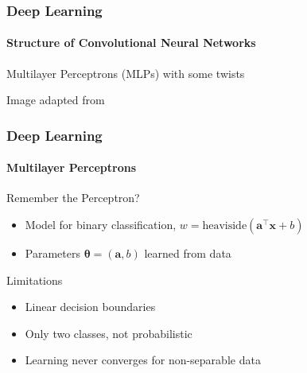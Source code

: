 \documentclass[xetex,professionalfont]{beamer}
\renewcommand{\vec}[1]{\ensuremath{\mathbf{#1}}}
\newcommand{\va}{\vec{a}}
\newcommand{\vx}{\vec{x}}
\newcommand{\bth}{\boldsymbol{\theta}}
\renewcommand\emph[1]{\textcolor{tuwcvl_inf_red}{#1}}
\begin{document}
\begin{frame}
\frametitle{Deep Learning}
\framesubtitle{Structure of Convolutional Neural Networks}

\emph{Multilayer Perceptrons} (\emph{MLPs}) with some twists

\bigskip
\begin{center}
    {\centering Image adapted from \cite{bishop2006}}
\end{center}

\end{frame}


\begin{frame}
\frametitle{Deep Learning}
\framesubtitle{Multilayer Perceptrons}

Remember the \emph{Perceptron}?
\begin{itemize}
    \item Model for binary classification, $w=\text{heaviside}(\va^\top\vx+b)$
    \item Parameters $\bth=(\va,b)$ learned from data %
\end{itemize}

\bigskip
Limitations
\begin{itemize}
    \item Linear decision boundaries
    \item Only two classes, not probabilistic
    \item Learning never converges for non-separable data
\end{itemize}

\end{frame}

\end{document}
